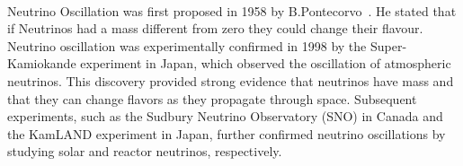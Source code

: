 \\
Neutrino Oscillation was first proposed in 1958 by B.Pontecorvo~\cite{berger2025particle}. He stated that if Neutrinos had a mass different from zero they could change their flavour. Neutrino oscillation was experimentally confirmed in 1998 by the Super-Kamiokande experiment in Japan, which observed the oscillation of atmospheric neutrinos. 
This discovery provided strong evidence that neutrinos have mass and that they can change flavors as they propagate through space. 
Subsequent experiments, such as the Sudbury Neutrino Observatory (SNO) in Canada and the KamLAND experiment in Japan, further confirmed neutrino oscillations by studying solar and reactor neutrinos, respectively.


